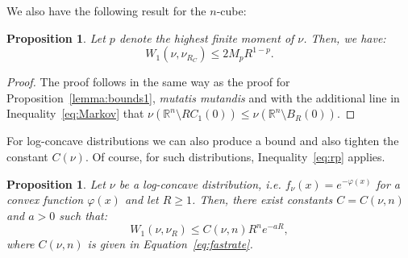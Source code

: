 \documentclass{amsart}
\theoremstyle{lemma}
\newtheorem{proposition}[theorem]{Proposition}
\theoremstyle{remark}
\begin{document}
We also have the following result for the $n$-cube:
\begin{proposition}
Let $p$ denote the highest finite moment of $\nu$. Then, we have:
\begin{equation}
W_1 (\nu, \nu_{R_{C}}) \leq 2M_pR^{1 - p}.
\end{equation}
\end{proposition}
\begin{proof}
The proof follows in the same way as the proof for Proposition~\ref{lemma:bounds1}, \textit{mutatis mutandis} and with the additional line in Inequality~\eqref{eq:Markov} that $\nu(\mathbb{R}^n \setminus RC_1(0)) \leq \nu(\mathbb{R}^n \setminus B_{R}(0))$.
\end{proof}

For log-concave distributions we can also produce a bound and also tighten the constant $C(\nu)$. Of course, for such distributions, Inequality~\eqref{eq:rp} applies.

\begin{proposition}\label{prop:logconcave}
Let $\nu$ be a log-concave distribution, i.e. $f_{\nu}(x) = e^{-\varphi(x)}$ for a convex function $\varphi(x)$ and let $R \geq 1$. Then, there exist constants $C = C(\nu, n)$ and $a>0$ such that:
\begin{equation}
W_1(\nu, \nu_{R}) \leq C(\nu, n) R^n e^{-aR},
\end{equation}
where $C(\nu, n)$ is given in Equation~\eqref{eq:fastrate}.
\end{proposition}
\end{document}
